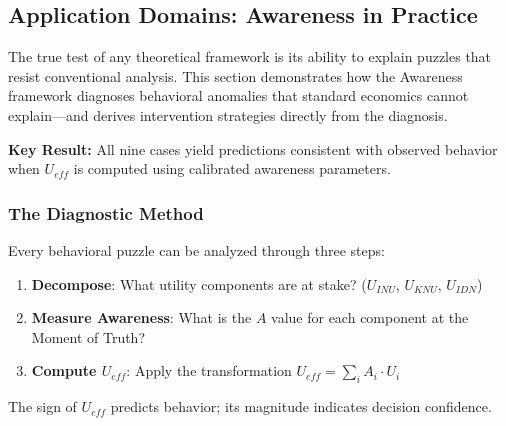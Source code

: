 \subsection{Application Domains: Awareness in Practice}
\label{subsec:11-16-applications}


The true test of any theoretical framework is its ability to explain puzzles that resist conventional analysis. This section demonstrates how the Awareness framework diagnoses behavioral anomalies that standard economics cannot explain---and derives intervention strategies directly from the diagnosis.

\textbf{Key Result:} All nine cases yield predictions consistent with observed behavior when $U_{eff}$ is computed using calibrated awareness parameters.

\subsubsection{The Diagnostic Method}

Every behavioral puzzle can be analyzed through three steps:

\begin{enumerate}
    \item \textbf{Decompose}: What utility components are at stake? ($U_{INU}$, $U_{KNU}$, $U_{IDN}$)
    \item \textbf{Measure Awareness}: What is the $A$ value for each component at the Moment of Truth?
    \item \textbf{Compute $U_{eff}$}: Apply the transformation $U_{eff} = \sum_i A_i \cdot U_i$
\end{enumerate}

The sign of $U_{eff}$ predicts behavior; its magnitude indicates decision confidence.


